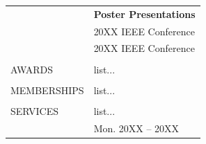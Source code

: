 \documentclass[oneside,openany]{report}
\begin{document}
\begin{singlespace}
\begin{longtable}{p{} p{}}
		& \textbf{Poster Presentations}\\
		& 20XX IEEE Conference \vspace{0.05in}\\
		& 20XX IEEE Conference
		\vspace{0.15in}
		\\\\
		
		AWARDS    
		& list... \vspace{0.05in}
		\\\\
		
		MEMBERSHIPS    
		& list...
		\\\\
		
		SERVICES    
		& list... \\&\hfill Mon. 20XX -- 20XX \\
\end{longtable}\addtocounter{table}{-1}
\end{singlespace}
\end{document}
